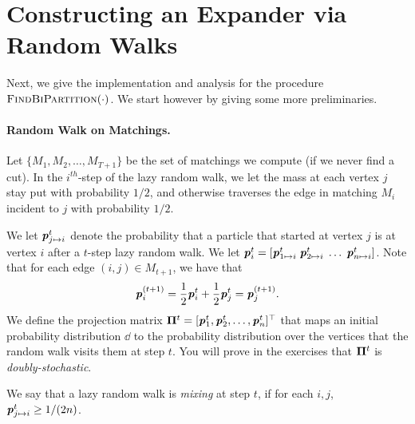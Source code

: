 \section{Constructing an Expander via Random Walks}

Next, we give the implementation and analysis for the procedure $\textsc{FindBiPartition}(\cdot)$. We start however by giving some more preliminaries.

\paragraph{Random Walk on Matchings.} Let $\{M_1, M_2, \dots, M_{T+1}\}$ be the set of matchings we compute (if we never find a cut). In the $i^{th}$-step of the lazy random walk,  we let the mass at each vertex $j$ stay put with probability $1/2$,  and otherwise traverses the edge in matching $M_i$ incident to $j$ with probability $1/2$. 

We let $\boldsymbol{\mathit{p}}_{j \mapsto i}^t$ denote the probability that a particle that started at vertex $j$ is at vertex $i$ after a $t$-step lazy random walk. We let $\boldsymbol{\mathit{p}}_i^t = [\boldsymbol{\mathit{p}}_{1 \mapsto i}^t\; \boldsymbol{\mathit{p}}_{2 \mapsto i}^t\; \dots \;\boldsymbol{\mathit{p}}_{n \mapsto i}^t]$. Note that for each edge $(i,j) \in M_{t+1}$, we have that 
\[
\boldsymbol{\mathit{p}}_i^{(t+1)} = \frac{1}{2} \boldsymbol{\mathit{p}}_i^t + \frac{1}{2} \boldsymbol{\mathit{p}}_j^t = \boldsymbol{\mathit{p}}_j^{(t+1)}.
\]
We define the projection matrix $\boldsymbol{\Pi}^t = [\boldsymbol{\mathit{p}}_1^{t}, \boldsymbol{\mathit{p}}_2^{t}, \dots, \boldsymbol{\mathit{p}}_n^{t}]^\top$ that maps an initial probability distribution $\dd$ to the probability distribution over the vertices that the random walk visits them at step $t$. You will prove in the exercises that $\boldsymbol{\Pi}^t$ is \emph{doubly-stochastic}.

We say that a lazy random walk is \emph{mixing} at step $t$, if for each $i,j$, $\boldsymbol{\mathit{p}}_{j \mapsto i}^t \geq 1/(2n)$. 

